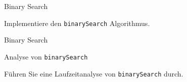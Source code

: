 \begin{frame}{Binary Search}
    \begin{myexercise}\label{myexercise:binarysearch}
        Implementiere den \texttt{binarySearch} Algorithmus.
    \end{myexercise}
\end{frame}

\begin{frame}{Binary Search}
    \begin{myanswer}
        
    \end{myanswer}
\end{frame}

\begin{frame}{Analyse von \texttt{binarySearch}}
    \begin{myexercise}\label{myexercise:binarysearchAnalysis}
        Führen Sie eine Laufzeitanalyse von \texttt{binarySearch} durch. 
    \end{myexercise}
\end{frame}

